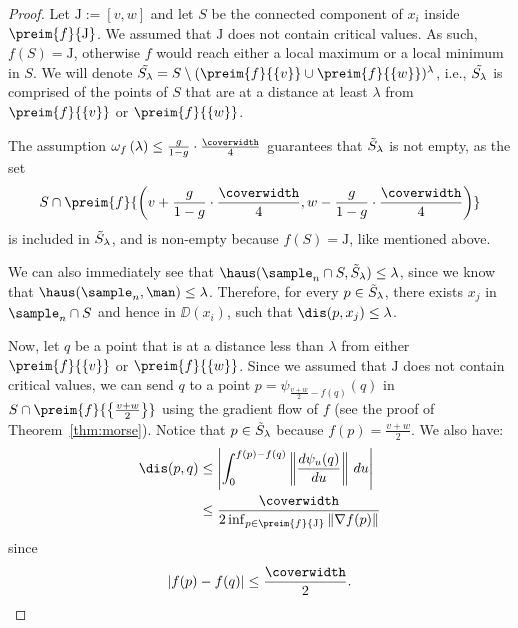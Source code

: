 \begin{proof}
Let $\mathrm{J}:=[v,w]$ and let $S$ be the connected component of $x_i$ inside $\preim{f}{\mathrm{J}}$. 
We assumed that $\mathrm{J}$ does not contain critical values. As such, $f\left(S\right)=\mathrm{J}$, otherwise $f$ would reach either a local maximum or a local minimum in $S$. 
We will denote $\Tilde{S_\lambda}=S\setminus (\preim{f}{\{v\}}\cup \preim{f}{\{w\}})^{\lambda}$, i.e., $\Tilde{S_\lambda}$ is comprised of the points of $S$ that %
are at a distance at least $\lambda$ from $\preim{f}{\{v\}}$ or $\preim{f}{\{w\}}$.

The assumption $\omega_f\left(\lambda\right)\leq\frac{g}{1-g}\cdot\frac{\coverwidth}{4}$ guarantees that $\Tilde{S}_\lambda$ is not empty, as the set
$$S\cap \preim{f}{ \left(v+\frac{g}{1-g}\cdot\frac{\coverwidth}{4},w-\frac{g}{1-g}\cdot\frac{\coverwidth}{4}\right)}$$
is included in $\Tilde{S}_\lambda$, and is non-empty  
because $f\left(S\right)=\mathrm{J}$, like mentioned above. 

We can also immediately see that $\haus(\sample_n\cap S,\Tilde{S}_\lambda)\leq\lambda$, since we know that $\haus(\sample_n,\man)\leq \lambda$.
Therefore, for every $p\in\Tilde{S}_\lambda$, there exists $x_j$ in $\sample_n\cap S$ and hence in $\DD(x_i)$, such that $\dis(p,x_j)\leq\lambda$.


Now, let $q$ be a point that is at a distance less than $\lambda$ from either $\preim{f}{\{v\}}$ or $\preim{f}{\{w\}}$. Since we assumed that $\mathrm{J}$ does not contain critical values, we can send $q$ to a point $p=\psi_{\frac{v+w}{2}-f(q)}(q)$ in $S\cap \preim{f}{\left\{\frac{v+w}{2}\right\}}$ using the gradient flow of $f$ (see the proof of Theorem~\ref{thm:morse}). Notice that $p\in\Tilde{S}_\lambda$ because $f(p)=\frac{v+w}{2}$. 
We also have:
\begin{align*}
\dis(p,q)&\leq\left|\int_{0}^{f(p)-f(q)}\left\Vert\frac{d\psi_{u}(q)}{du}\right\Vert\,du \right| \\
&\leq\frac{\coverwidth}{2\inf_{p\in \preim{f}{\mathrm{J}}}\Vert\nabla f(p)\Vert}
\end{align*}
since $$\left|f(p)-f(q)\right|\leq \frac{\coverwidth}{2}.$$


\end{proof}
